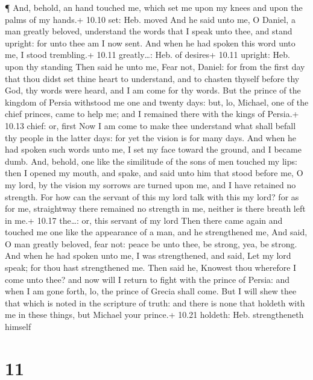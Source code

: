  ¶ And, behold, an hand touched me, which set me upon my
knees and upon the palms of my hands.+ 10.10 set: Heb. moved
 And he said unto me, O Daniel, a man greatly beloved,
understand the words that I speak unto thee, and stand upright: for unto
thee am I now sent. And when he had spoken this word unto me, I stood
trembling.+ 10.11 greatly\ldots: Heb. of desires+ 10.11 upright: Heb.
upon thy standing  Then said he unto me, Fear not, Daniel:
for from the first day that thou didst set thine heart to understand,
and to chasten thyself before thy God, thy words were heard, and I am
come for thy words.  But the prince of the kingdom of
Persia withstood me one and twenty days: but, lo, Michael, one of the
chief princes, came to help me; and I remained there with the kings of
Persia.+ 10.13 chief: or, first  Now I am come to make thee
understand what shall befall thy people in the latter days: for yet the
vision is for many days.  And when he had spoken such words
unto me, I set my face toward the ground, and I became dumb.
 And, behold, one like the similitude of the sons of men
touched my lips: then I opened my mouth, and spake, and said unto him
that stood before me, O my lord, by the vision my sorrows are turned
upon me, and I have retained no strength.  For how can the
servant of this my lord talk with this my lord? for as for me,
straightway there remained no strength in me, neither is there breath
left in me.+ 10.17 the\ldots: or, this servant of my lord 
Then there came again and touched me one like the appearance of a man,
and he strengthened me,  And said, O man greatly beloved,
fear not: peace be unto thee, be strong, yea, be strong. And when he had
spoken unto me, I was strengthened, and said, Let my lord speak; for
thou hast strengthened me.  Then said he, Knowest thou
wherefore I come unto thee? and now will I return to fight with the
prince of Persia: and when I am gone forth, lo, the prince of Grecia
shall come.  But I will shew thee that which is noted in
the scripture of truth: and there is none that holdeth with me in these
things, but Michael your prince.+ 10.21 holdeth: Heb. strengtheneth
himself

\hypertarget{section-10}{%
\section{11}\label{section-10}}

